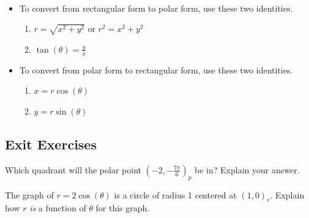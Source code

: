 \begin{myDefinition}~\\[-0.5mm]
	\begin{itemize}
		\item To convert from rectangular form to polar form, use these two identities.
			\begin{enumerate}[itemsep=0.5cm]
				\item $r=\sqrt{x^2+y^2}$ or $r^2=x^2+y^2$
				\item $\tan(\theta)=\frac{y}{x}$
			\end{enumerate}
		\item To convert from polar form to rectangular form, use these two identities.
			\begin{enumerate}[itemsep=0.5cm]
				\item $x=r\cos(\theta)$
				\item $y=r\sin(\theta)$
			\end{enumerate}
	\end{itemize}
\end{myDefinition}

\newpage

\subsection*{Exit Exercises} \label{exit-exercises-section-polar-coordinates}

\begin{myExit}
	Which quadrant will the polar point $\left(-2,-\frac{7\pi}{6}\right)_p$ be in? Explain your answer.
\end{myExit}
\vfill

\begin{myExit}
	The graph of $r=2\cos(\theta)$ is a circle of radius 1 centered at $(1,0)_r$. Explain how $r$ \emph{is} a function of $\theta$ for this graph.
\end{myExit}
\vfill


